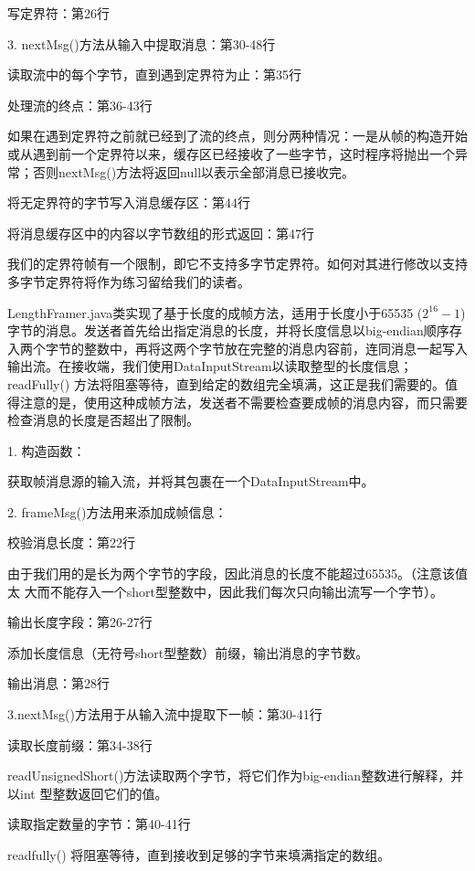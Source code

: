 	写定界符：第26行 

	3. nextMsg()方法从输入中提取消息：第30-48行 

	读取流中的每个字节，直到遇到定界符为止：第35行 

	处理流的终点：第36-43行 

	如果在遇到定界符之前就已经到了流的终点，则分两种情况：一是从帧的构造开始或从遇到前一个定界符以来，缓存区已经接收了一些字节，这时程序将抛出一个异常；否则nextMsg()方法将返回null以表示全部消息已接收完。 

	将无定界符的字节写入消息缓存区：第44行 

	将消息缓存区中的内容以字节数组的形式返回：第47行 

	我们的定界符帧有一个限制，即它不支持多字节定界符。如何对其进行修改以支持多字节定界符将作为练习留给我们的读者。 

	LengthFramer.java类实现了基于长度的成帧方法，适用于长度小于65535 ($2^{16}-1$)字节的消息。发送者首先给出指定消息的长度，并将长度信息以big-endian顺序存入两个字节的整数中，再将这两个字节放在完整的消息内容前，连同消息一起写入输出流。在接收端，我们使用DataInputStream以读取整型的长度信息；readFully() 方法将阻塞等待，直到给定的数组完全填满，这正是我们需要的。值得注意的是，使用这种成帧方法，发送者不需要检查要成帧的消息内容，而只需要检查消息的长度是否超出了限制。 

	

	1. 构造函数：

	获取帧消息源的输入流，并将其包裹在一个DataInputStream中。 

	2. frameMsg()方法用来添加成帧信息：

	校验消息长度：第22行 

	由于我们用的是长为两个字节的字段，因此消息的长度不能超过65535。（注意该值太
	大而不能存入一个short型整数中，因此我们每次只向输出流写一个字节）。 

	输出长度字段：第26-27行 

	添加长度信息（无符号short型整数）前缀，输出消息的字节数。 

	输出消息：第28行 

	3.nextMsg()方法用于从输入流中提取下一帧：第30-41行 

	读取长度前缀：第34-38行 

	readUnsignedShort()方法读取两个字节，将它们作为big-endian整数进行解释，并以int
	型整数返回它们的值。 

	读取指定数量的字节：第40-41行 

	readfully() 将阻塞等待，直到接收到足够的字节来填满指定的数组。 

